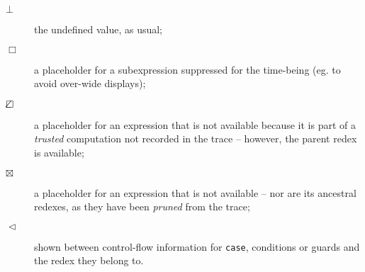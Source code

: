 \documentclass[12pt]{article}
\newcommand{\emptyBox}{\Box}
\newcommand{\dashedBox}{\Box\hspace{-9pt}\angle}
\newcommand{\crossBox}{\boxtimes}
\newcommand{\within}{\vartriangleleft}
\begin{document}
\begin{description}

\item[$\bot$]
the undefined value, as usual;

\item[$\emptyBox$]
a placeholder for a subexpression suppressed for
the time-being (eg. to avoid over-wide displays);

\item[$\dashedBox$]
a placeholder for an expression that
is not available because it is part of a
\emph{trusted} computation not recorded in
the trace -- however, the parent redex
is available; 
    
\item[$\crossBox$]
a placeholder for an expression that
is not available -- nor are its ancestral
redexes, as they have been
\emph{pruned} from the trace;

\item[$\within$]
shown between control-flow information for \texttt{case}, conditions or guards and the redex they belong to.
\end{description}


\end{document}
